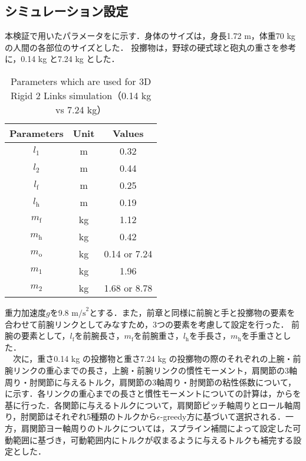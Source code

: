 \subsection{シミュレーション設定}
本検証で用いたパラメータをに示す．身体のサイズは，身長1.72 m，体重70 kgの人間の各部位のサイズとした．
投擲物は，野球の硬式球と砲丸の重さを参考に，0.14 kg と7.24 kg とした．
\begin{table}[tb]
  \begin{center}
    \caption{Parameters which are used for 3D Rigid 2 Links simulation（0.14 kg vs 7.24 kg）}
    \begin{tabular}{c|c|c}
      \hline
      Parameters & Unit & Values \\
      \hline
      $l_{1}$ & m & 0.32 \\
      $l_{2}$ & m & 0.44 \\
      $l_{\mathrm{f}}$ & m & 0.25 \\
      $l_{\mathrm{h}}$ & m & 0.19 \\
      $m_{\mathrm{f}}$ & kg & 1.12 \\
      $m_{\mathrm{h}}$ & kg & 0.42 \\
      $m_{\mathrm{o}}$ & kg & 0.14 or 7.24 \\
      $m_{1}$ & kg & 1.96 \\
      $m_{2}$ & kg & 1.68 or 8.78 \\
      \hline
    \end{tabular}
  \end{center}
\end{table}
重力加速度$g$を9.8 $\mathrm{m/s}^{2}$とする．また，前章と同様に前腕と手と投擲物の要素を合わせて前腕リンクとしてみなすため，3つの要素を考慮して設定を行った．
前腕の要素として，$l_{\mathrm{f}}$を前腕長さ，$m_{\mathrm{f}}$を前腕重さ，$l_{\mathrm{h}}$を手長さ，$m_{\mathrm{h}}$を手重さとした．\\
　次に，重さ0.14 kg の投擲物と重さ7.24 kg の投擲物の際のそれぞれの上腕・前腕リンクの重心までの長さ，上腕・前腕リンクの慣性モーメント，肩関節の3軸周り・肘関節に与えるトルク，肩関節の3軸周り・肘関節の粘性係数について，に示す．各リンクの重心までの長さと慣性モーメントについての計算は，からを基に行った．各関節に与えるトルクについて，肩関節ピッチ軸周りとロール軸周り，肘関節はそれぞれ5種類のトルクから$\epsilon$-greedy方に基づいて選択される．一方，肩関節ヨー軸周りのトルクについては，スプライン補間によって設定した可動範囲に基づき，可動範囲内にトルクが収まるように与えるトルクも補完する設定とした．

